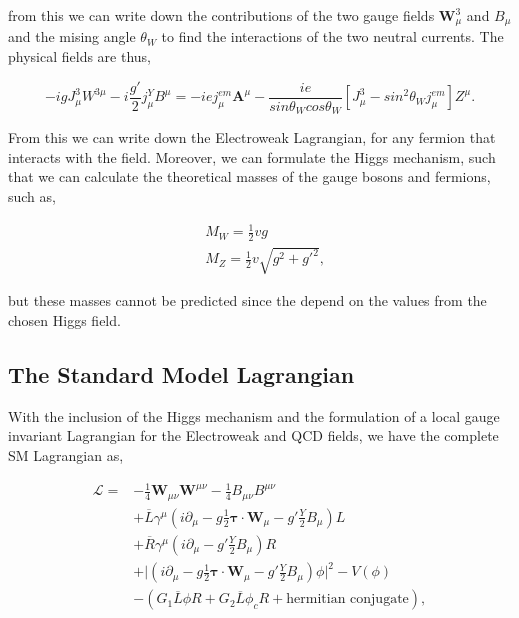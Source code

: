 from this we can write down the contributions of the two gauge fields $\boldsymbol{W}_\mu^3$ and $B_\mu$ and the mising angle $\theta_W$ to find the interactions of the two neutral currents. The physical fields are thus,

\begin{equation}
-igJ_\mu^3W^{3\mu}-i\frac{g'}{2}j_\mu^YB^\mu=-iej_\mu^{em}\boldsymbol{A}^\mu-\frac{ie}{sin\theta_Wcos\theta_W}[J_\mu^3-sin^2\theta_Wj_\mu^{em}]Z^\mu.
\end{equation}

From this we can write down the Electroweak Lagrangian, for any fermion that interacts with the field. Moreover, we can formulate the Higgs mechanism, such that we can calculate the theoretical masses of the gauge bosons and fermions, such as, 

\begin{equation}
\begin{split}
& M_W=\frac{1}{2}vg \\
& M_Z=\frac{1}{2}v\sqrt{g^2+g'^2},
\end{split}
\end{equation}

but these masses cannot be predicted since the depend on the values from the chosen Higgs field. 

\subsection{The Standard Model Lagrangian}

With the inclusion of the Higgs mechanism and the formulation of a local gauge invariant Lagrangian for the Electroweak and QCD fields, we have the complete SM Lagrangian as,

\begin{equation}\label{SMLagrangian}
\begin{split}
\mathcal{L}=&-\frac{1}{4}\boldsymbol{W}_{\mu\nu}\boldsymbol{W}^{\mu\nu}-\frac{1}{4}B_{\mu\nu}B^{\mu\nu} \\
&+\overline{L}\gamma^\mu(i\partial_\mu-g\frac{1}{2}\boldsymbol{\tau}\cdot\boldsymbol{W}_\mu-g'\frac{Y}{2}B_\mu)L \\
&+\overline{R}\gamma^\mu(i\partial_\mu-g'\frac{Y}{2}B_\mu)R \\
&+\lvert(i\partial_\mu-g\frac{1}{2}\boldsymbol{\tau}\cdot\boldsymbol{W}_\mu-g'\frac{Y}{2}B_\mu)\phi\lvert^2-V(\phi) \\
&-(G_1\overline{L}\phi R+G_2\overline{L}\phi_cR+\text{hermitian conjugate}),
\end{split}
\end{equation}

